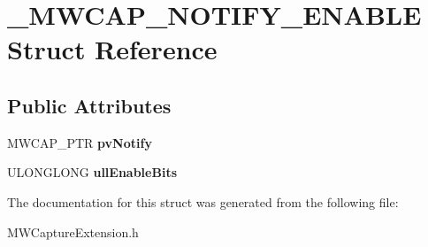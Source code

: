 \hypertarget{struct__MWCAP__NOTIFY__ENABLE}{\section{\-\_\-\-M\-W\-C\-A\-P\-\_\-\-N\-O\-T\-I\-F\-Y\-\_\-\-E\-N\-A\-B\-L\-E Struct Reference}
\label{struct__MWCAP__NOTIFY__ENABLE}
}
\subsection*{Public Attributes}
\begin{DoxyCompactItemize}
\item 
\hypertarget{struct__MWCAP__NOTIFY__ENABLE_a9d93e5c31a888ccf1f2cbf49f142d6a8}{M\-W\-C\-A\-P\-\_\-\-P\-T\-R {\bfseries pv\-Notify}}\label{struct__MWCAP__NOTIFY__ENABLE_a9d93e5c31a888ccf1f2cbf49f142d6a8}

\item 
\hypertarget{struct__MWCAP__NOTIFY__ENABLE_ab9d8ef87751a093cde317249afad7948}{U\-L\-O\-N\-G\-L\-O\-N\-G {\bfseries ull\-Enable\-Bits}}\label{struct__MWCAP__NOTIFY__ENABLE_ab9d8ef87751a093cde317249afad7948}

\end{DoxyCompactItemize}


The documentation for this struct was generated from the following file\-:\begin{DoxyCompactItemize}
\item 
M\-W\-Capture\-Extension.\-h\end{DoxyCompactItemize}
